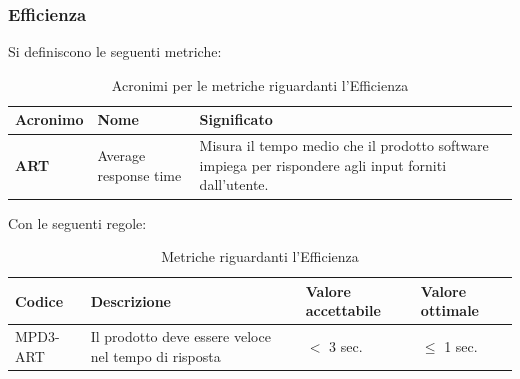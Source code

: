 \subsubsection{Efficienza}
Si definiscono le seguenti metriche:
\begin{table}[h!]
\centering
\def\arraystretch{1.5}
\begin{tabular}{ |m{2cm}|m{5.5cm}|m{6.5cm}| }
\hline
\rowcolor{lightgray!30}
\textbf{Acronimo} & \textbf{Nome} & \textbf{Significato}\\
\hline
\textbf{ART} & Average response time & Misura il tempo medio che il prodotto software impiega per rispondere agli input forniti dall'utente.\\
\hline
\end{tabular}
\caption{Acronimi per le metriche riguardanti l'Efficienza}
\end{table}
\par Con le seguenti regole:
\begin{table}[h!]
\centering
\def\arraystretch{1.5}
\begin{tabular}{ |>{\centering\arraybackslash}m{2.5cm}|>{\centering\arraybackslash}m{5.5cm}|>{\centering\arraybackslash}m{3cm}|>{\centering\arraybackslash}m{3cm}| }
\hline
\rowcolor{black}
\textbf{\color{white} Codice} & \textbf{\color{white} Descrizione} & \textbf{\color{white} Valore accettabile} & \textbf{\color{white} Valore ottimale}\\
\hline
MPD3-ART & Il prodotto deve essere veloce nel tempo di risposta & $<$ 3 sec. & $\leq$ 1 sec. \\
\hline
\end{tabular}
\caption{Metriche riguardanti l'Efficienza}
\end{table}

